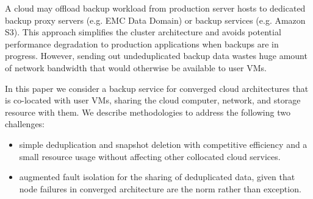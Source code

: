 A cloud may offload backup workload from production 
server hosts to dedicated backup proxy servers (e.g. EMC Data Domain) or
backup services (e.g. Amazon S3). This approach simplifies the cluster 
architecture and 
avoids potential performance degradation to production applications when 
backups are in progress.
However, sending out undeduplicated backup data wastes huge amount
of network bandwidth that would otherwise be available to user VMs. 

In this paper we consider a backup service for converged cloud architectures
that is co-located with user VMs, sharing the cloud computer, network, and
storage resource with them.
We describe methodologies to address the following two challenges: 
\begin{itemize}
\item simple deduplication and snapshot deletion with competitive efficiency and 
a small resource usage without affecting other collocated cloud services.
\item augmented fault isolation for the sharing of deduplicated data,
given that node failures in converged architecture are the norm rather than
exception. 
\end{itemize}


 

